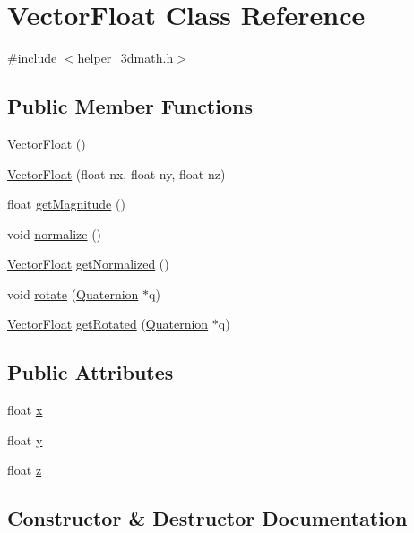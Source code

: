 \hypertarget{classVectorFloat}{}\section{Vector\+Float Class Reference}
\label{classVectorFloat}


{\ttfamily \#include $<$helper\+\_\+3dmath.\+h$>$}

\subsection*{Public Member Functions}
\begin{DoxyCompactItemize}
\item 
\hyperlink{classVectorFloat_a8b54ec5c117ca7101cff478b3cfaa0cc}{Vector\+Float} ()
\item 
\hyperlink{classVectorFloat_a3b12ed03e28bded4316275882433e5aa}{Vector\+Float} (float nx, float ny, float nz)
\item 
float \hyperlink{classVectorFloat_abe0c3954d8da8829a053125df1ce63d5}{get\+Magnitude} ()
\item 
void \hyperlink{classVectorFloat_a112eaf8758a6f51b96ed1ccb71700495}{normalize} ()
\item 
\hyperlink{classVectorFloat}{Vector\+Float} \hyperlink{classVectorFloat_aacb5e7ca59563c47dd066d8b1264ec4b}{get\+Normalized} ()
\item 
void \hyperlink{classVectorFloat_afef0e6d631fb1eb67b6913e90730aa9e}{rotate} (\hyperlink{classQuaternion}{Quaternion} $\ast$q)
\item 
\hyperlink{classVectorFloat}{Vector\+Float} \hyperlink{classVectorFloat_ab4093d50e98baf0d98b437a2b3ee7c2e}{get\+Rotated} (\hyperlink{classQuaternion}{Quaternion} $\ast$q)
\end{DoxyCompactItemize}
\subsection*{Public Attributes}
\begin{DoxyCompactItemize}
\item 
float \hyperlink{classVectorFloat_a2d8e5159f045ca977769d168af75320c}{x}
\item 
float \hyperlink{classVectorFloat_a4affe2a9de97600b3d8df98586679e14}{y}
\item 
float \hyperlink{classVectorFloat_a54b8e4234e3b48e106d090570755f107}{z}
\end{DoxyCompactItemize}


\subsection{Constructor \& Destructor Documentation}
